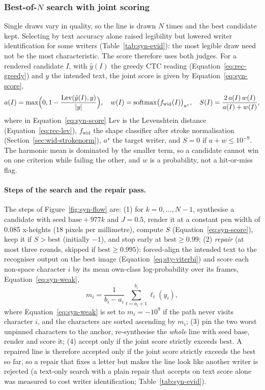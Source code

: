 \subsubsection{Best-of-$N$ search with joint scoring}
\label{sec:syn-search}

Single draws vary in quality, so the line is drawn $N$ times and the best candidate kept.
Selecting by text accuracy alone raised legibility but lowered writer identification for some writers (Table~\ref{tab:syn-evid}): the most legible draw need not be the most characteristic.
The score therefore uses both judges.
For a rendered candidate $I$, with $\hat y(I)$ the greedy CTC reading (Equation~\ref{eq:rec-greedy}) and $y$ the intended text, the joint score is given by Equation~\ref{eq:syn-score},
\begin{equation}
a(I)=\max\Bigl(0,1-\frac{\mathrm{Lev}(\hat y(I),y)}{|y|}\Bigr),\quad w(I)=\mathrm{softmax}\bigl(f_{\mathrm{wid}}(I)\bigr)_{a^\star},\quad S(I)=\frac{2\,a(I)\,w(I)}{a(I)+w(I)},
\label{eq:syn-score}
\end{equation}
where in Equation~\ref{eq:syn-score} $\mathrm{Lev}$ is the Levenshtein distance (Equation~\ref{eq:rec-lev}), $f_{\mathrm{wid}}$ the shape classifier after stroke normalisation (Section~\ref{sec:wid-strokenorm}), $a^\star$ the target writer, and $S=0$ if $a+w\le10^{-9}$.
The harmonic mean is dominated by the smaller term, so a candidate cannot win on one criterion while failing the other, and $w$ is a probability, not a hit-or-miss flag.

\paragraph{Steps of the search and the repair pass.}
The steps of Figure~\ref{fig:syn-flow} are:
(1) for $k=0,\ldots,N-1$, synthesise a candidate with seed $\mathrm{base}+977k$ and $J=0.5$, render it at a constant pen width of 0.085 x-heights (18 pixels per millimetre), compute $S$ (Equation~\ref{eq:syn-score}), keep it if $S>\mathrm{best}$ (initially $-1$), and stop early at $\mathrm{best}\ge0.99$;
(2) \emph{repair} (at most three rounds, skipped if $\mathrm{best}\ge0.995$): forced-align the intended text to the recogniser output on the best image (Equation~\ref{eq:sty-viterbi}) and score each non-space character $i$ by its mean own-class log-probability over its frames, Equation~\ref{eq:syn-weak},
\begin{equation}
m_i=\frac{1}{b_i-a_i}\sum_{t=a_i+1}^{b_i}\ell_t(y_i),
\label{eq:syn-weak}
\end{equation}
where Equation~\ref{eq:syn-weak} is set to $m_i=-10^9$ if the path never visits character $i$, and the characters are sorted ascending by $m_i$;
(3) pin the two worst unpinned characters to the anchor, re-synthesise the \emph{whole} line with seed $\mathrm{base}$, render and score it;
(4) accept only if the joint score strictly exceeds $\mathrm{best}$.
A repaired line is therefore accepted only if the joint score strictly exceeds the best so far, so a repair that fixes a letter but makes the line look like another writer is rejected (a text-only search with a plain repair that accepts on text score alone was measured to cost writer identification; Table~\ref{tab:syn-evid}).

